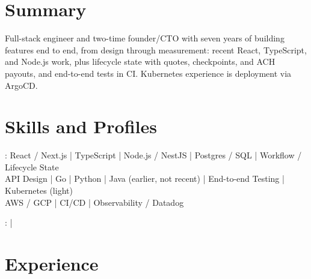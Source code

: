 \documentclass[print]{jack-resume}
\begin{document}
\pagecolor{darkmodeBackground}


\begin{minipage}[t][1cm][t]{.03\textwidth}
    \hfill
\end{minipage}

\section{Summary}
Full-stack engineer and two-time founder/CTO with seven years of building features end to end, from design through measurement: recent React, TypeScript, and Node.js work, plus lifecycle state with quotes, checkpoints, and ACH payouts, and end-to-end tests in CI. Kubernetes experience is deployment via ArgoCD.
\sectionsep

\section{Skills and Profiles}
:
React / Next.js \hfill | \hfill
TypeScript \hfill | \hfill
Node.js / NestJS \hfill | \hfill
Postgres / SQL \hfill | \hfill
Workflow / Lifecycle State \\
\hspace{1.0cm} API Design \hfill | \hfill
Go \hfill | \hfill
Python \hfill | \hfill
Java (earlier, not recent) \hfill | \hfill
End-to-end Testing \hfill | \hfill
Kubernetes (light) \\
\hspace{1.0cm} AWS / GCP \hfill | \hfill
CI/CD \hfill | \hfill
Observability / Datadog \\

\raggedright{
    :
      \href{https://www.linkedin.com/in/jack-sturtevant/}{ \ExternalLink} |
     \href{https://github.com/jacksturt}{ \ExternalLink}}

\section{Experience}
\end{document}
